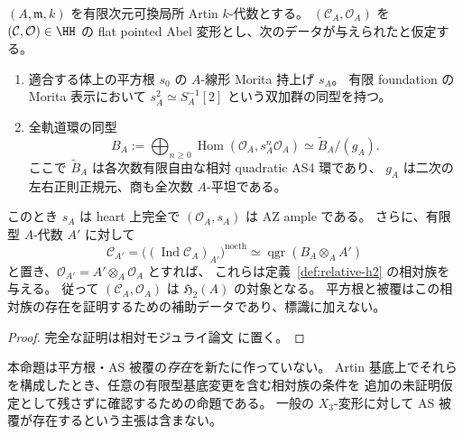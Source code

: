 \begin{proposition}
\label{prop:artin-witness-relative-promotion}
$(A,\mathfrak m,k)$ を有限次元可換局所 Artin $k$-代数とする。
$(\mathcal C_A,\mathcal O_A)$ を $(\mathcal C,\mathcal O)\in\HH$ の
flat pointed Abel 変形とし、次のデータが与えられたと仮定する。
\begin{enumerate}
\item 適合する体上の平方根 $s_0$ の $A$-線形 Morita 持上げ $s_A$。
  有限 foundation の Morita 表示において
  $s_A^2\simeq S_A^{-1}[2]$ という双加群の同型を持つ。
\item 全軌道環の同型
  \[
   B_A:=\bigoplus_{n\ge0}
     \operatorname{Hom}(\mathcal O_A,s_A^n\mathcal O_A)
   \simeq\widetilde B_A/(g_A).
  \]
  ここで $\widetilde B_A$ は各次数有限自由な相対 quadratic AS4 環であり、
  $g_A$ は二次の左右正則正規元、商も全次数 $A$-平坦である。
\end{enumerate}
このとき $s_A$ は heart 上完全で $(\mathcal O_A,s_A)$ は AZ ample である。
さらに、有限型 $A$-代数 $A'$ に対して
\[
 \mathcal C_{A'}=
 \bigl((\operatorname{Ind}\mathcal C_A)_{A'}\bigr)^{\mathrm{noeth}}
 \simeq \operatorname{qgr}(B_A\otimes_A A')
\]
と置き、$\mathcal O_{A'}=A'\otimes_A\mathcal O_A$ とすれば、
これらは定義~\ref{def:relative-h2} の相対族を与える。
従って $(\mathcal C_A,\mathcal O_A)$ は $\mathfrak H_2(A)$ の対象となる。
平方根と被覆はこの相対族の存在を証明するための補助データであり、標識に加えない。
\end{proposition}
\begin{proof}
完全な証明は相対モジュライ論文 \cite[\texttt{artin_foundation}]{QuadricModuli2026} に置く。
\end{proof}

\begin{remark}
本命題は平方根・AS 被覆の\emph{存在}を新たに作っていない。
Artin 基底上でそれらを構成したとき、任意の有限型基底変更を含む相対族の条件を
追加の未証明仮定として残さずに確認するための命題である。
一般の $X_3$-変形に対して AS 被覆が存在するという主張は含まない。
\end{remark}
